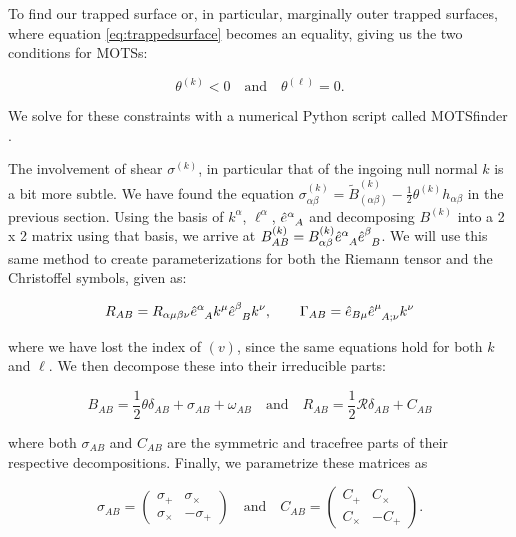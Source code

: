 \documentclass[twoside, openright]{RadboudReport}
\newcommand{\ab}{{\alpha\beta}}
\begin{document}
To find our trapped surface or, in particular, marginally outer trapped surfaces, where equation \ref{eq:trappedsurface} becomes an equality, giving us the two conditions for MOTSs:

\begin{equation}
	\theta^{(k)} < 0 \quad \text{and} \quad \theta^{(\ell)} = 0.
\end{equation} 

We solve for these constraints with a numerical Python script called MOTSfinder \cite{motsfinder}. \newline

The involvement of shear $\sigma^{(k)}$, in particular that of the ingoing null normal $k$ is a bit more subtle. We have found the equation $\sigma^{(k)}_\ab = \tilde{B}^{(k)}_{(\ab)} - \frac{1}{2}\theta^{(k)} h_\ab$ in the previous section. Using the basis of $k^\alpha$, $\ell^\alpha$, $\hat{e}^\alpha_{\hphantom{\alpha}A}$ and decomposing $B^{(k)}$ into a 2 x 2 matrix using that basis, we arrive at $B^{(k)}_{AB} = B^{(k)}_\ab \hat{e}^\alpha_{\hphantom{\alpha}A}\hat{e}^\beta_{\hphantom{\beta}B}$. We will use this same method to create parameterizations for both the Riemann tensor and the Christoffel symbols, given as:

\begin{equation*}
	R_{AB} = R_{\alpha\mu\beta\nu} \hat{e}^\alpha_{\hphantom{\alpha}A}k^\mu\hat{e}^\beta_{\hphantom{\beta}B}k^\nu, \qquad \Gamma_{AB} = \hat{e}_{B\mu}\hat{e}^\mu_{\hphantom{\mu}A;\nu}k^\nu
\end{equation*}

where we have lost the index of $(v)$, since the same equations hold for both $k$ and $\ell$. We then decompose these into their irreducible parts:

\begin{equation*}
	B_{AB }= \frac{1}{2}\theta\delta_{AB} + \sigma_{AB} + \omega_{AB} \quad \text{and} \quad R_{AB} = \frac{1}{2}\mathscr{R} \delta_{AB}+ C_{AB}
\end{equation*}

where both $\sigma_{AB}$ and $C_{AB}$ are the symmetric and tracefree parts of their respective decompositions. Finally, we parametrize these matrices as 

\begin{equation*}
	\sigma_{AB} = 
	\begin{pmatrix}
		\sigma_+ & \sigma_\times \\
		\sigma_\times & -\sigma_+ 
	\end{pmatrix}
	\quad \text{and} \quad
	C_{AB} =
	\begin{pmatrix}
		C_+ & C_\times \\
		C_\times & -C_+ 
	\end{pmatrix}.
\end{equation*}
\end{document}
